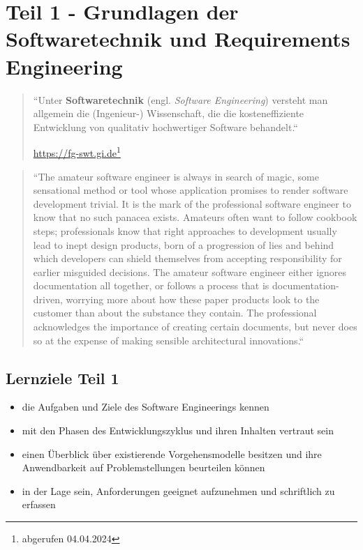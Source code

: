 \chapter*{Teil 1 - Grundlagen der Softwaretechnik und Requirements Engineering}

\vspace{2cm}
\blockquote[{\url{https://fg-swt.gi.de}\footnote{abgerufen 04.04.2024}}]{``Unter \textbf{Softwaretechnik} (engl. \textit{Software Engineering}) versteht man allgemein die (Ingenieur-) Wissenschaft, die die kosteneffiziente Entwicklung von qualitativ hochwertiger Software behandelt.``}
\vspace{2cm}
\blockquote[{\cite[247]{BMEY07}}]{
    ``The amateur software engineer is always in search
    of magic, some sensational method or tool whose
    application promises to render software development trivial. It is the mark of the professional software engineer to know that no such panacea exists.
    Amateurs often want to follow cookbook steps; professionals know that right approaches to development usually lead to inept design products, born of a
    progression of lies and behind which developers can
    shield themselves from accepting responsibility for
    earlier misguided decisions. The amateur software
    engineer either ignores documentation all together,
    or follows a process that is documentation-driven,
    worrying more about how these paper products look
    to the customer than about the substance they contain. The professional acknowledges the importance
    of creating certain documents, but never does so at
    the expense of making sensible architectural innovations.``
}

\newpage
\section*{Lernziele Teil 1}

\begin{itemize}
    \item die Aufgaben und Ziele  des Software Engineerings kennen
    \item mit den Phasen des Entwicklungszyklus und ihren Inhalten vertraut sein
    \item einen Überblick über existierende Vorgehensmodelle besitzen und ihre Anwendbarkeit auf Problemstellungen beurteilen können
    \item in der Lage sein, Anforderungen geeignet aufzunehmen und schriftlich zu erfassen
\end{itemize}
